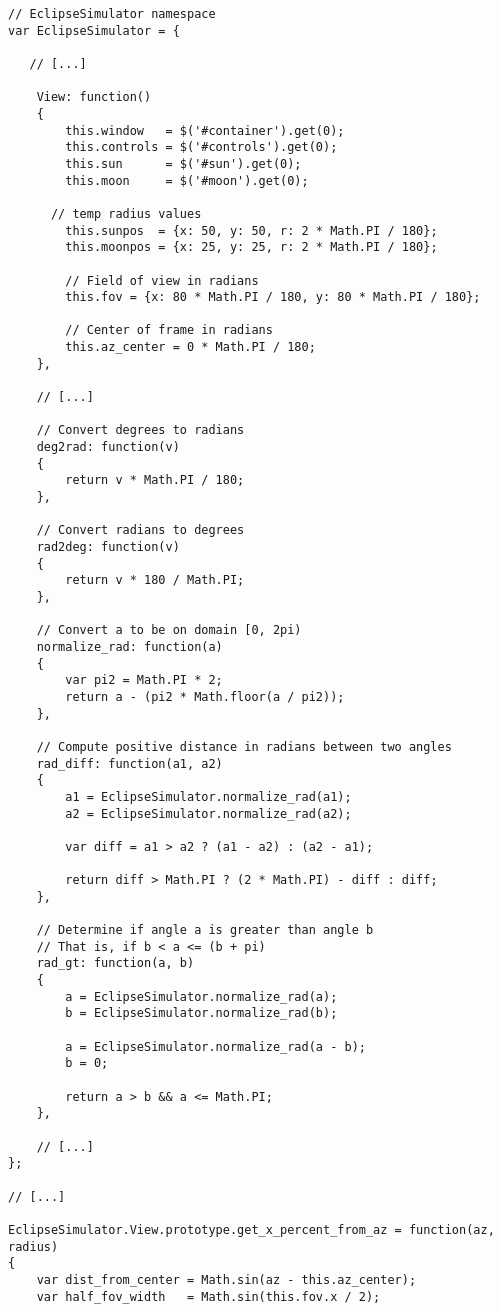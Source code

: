 \documentclass[10pt, onecolumn, draftclsnofoot, letterpaper, compsoc]{IEEEtran}
\begin{document}
\begin{verbatim}
// EclipseSimulator namespace
var EclipseSimulator = {

   // [...]

    View: function()
    {
        this.window   = $('#container').get(0);
        this.controls = $('#controls').get(0);
        this.sun      = $('#sun').get(0);
        this.moon     = $('#moon').get(0);

      // temp radius values
        this.sunpos  = {x: 50, y: 50, r: 2 * Math.PI / 180};
        this.moonpos = {x: 25, y: 25, r: 2 * Math.PI / 180};

        // Field of view in radians
        this.fov = {x: 80 * Math.PI / 180, y: 80 * Math.PI / 180};

        // Center of frame in radians
        this.az_center = 0 * Math.PI / 180;
    },

    // [...]

    // Convert degrees to radians
    deg2rad: function(v)
    {
        return v * Math.PI / 180;
    },

    // Convert radians to degrees
    rad2deg: function(v)
    {
        return v * 180 / Math.PI;
    },

    // Convert a to be on domain [0, 2pi)
    normalize_rad: function(a)
    {
        var pi2 = Math.PI * 2;
        return a - (pi2 * Math.floor(a / pi2));
    },

    // Compute positive distance in radians between two angles
    rad_diff: function(a1, a2)
    {
        a1 = EclipseSimulator.normalize_rad(a1);
        a2 = EclipseSimulator.normalize_rad(a2);

        var diff = a1 > a2 ? (a1 - a2) : (a2 - a1);

        return diff > Math.PI ? (2 * Math.PI) - diff : diff;
    },

    // Determine if angle a is greater than angle b
    // That is, if b < a <= (b + pi)
    rad_gt: function(a, b)
    {
        a = EclipseSimulator.normalize_rad(a);
        b = EclipseSimulator.normalize_rad(b);

        a = EclipseSimulator.normalize_rad(a - b);
        b = 0;

        return a > b && a <= Math.PI;
    },

    // [...]
};

// [...]

EclipseSimulator.View.prototype.get_x_percent_from_az = function(az, radius)
{
    var dist_from_center = Math.sin(az - this.az_center);
    var half_fov_width   = Math.sin(this.fov.x / 2);


\end{verbatim}
\end{document}
